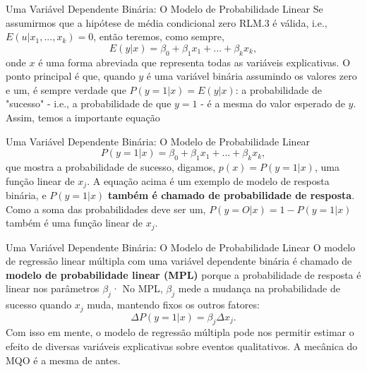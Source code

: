 \documentclass[t,14pt,mathserif]{beamer}
\begin{document}
{
\begin{frame}{Uma Variável Dependente Binária: O Modelo de Probabilidade Linear}
		\justifying 
         Se assumirmos que a hipótese de média condicional zero RLM.3 é válida, i.e., $E(u|x_1, ... ,x_k) = 0$, então teremos, como sempre,
        \begin{equation}
        E(y|x) = \beta_{0} + \beta_{1}x_1 + ... + \beta_{k}x_k, \nonumber
        \end{equation}
        onde $x$ é uma forma abreviada que representa todas as variáveis explicativas.
        \vfill
        O ponto principal é que, quando $y$ é uma variável binária assumindo os valores zero e um, é sempre verdade que $P(y = 1|x) = E(y|x)$: a probabilidade de "sucesso" - i.e., a probabilidade de que $y = 1$ - é a mesma do valor esperado de $y$. Assim, temos a importante equação
        
        \end{frame}
}  
   
{
\begin{frame}{Uma Variável Dependente Binária: O Modelo de Probabilidade Linear}
		\justifying 
        \begin{equation}
        P(y = 1|x) = \beta_{0} + \beta_{1}x_1 + ... + \beta_{k}x_k, \nonumber
        \end{equation}
       que mostra a probabilidade de sucesso, digamos, $p(x) = P(y = 1 |x)$, uma função linear de $x_j$. 
        \vfill 
        A equação acima é um exemplo de modelo de resposta binária, e $P(y = 1 |x)$  \textbf{também é chamado de probabilidade de resposta}. Como a soma das probabilidades deve ser um, $P(y = O|x) = 1 - P(y = 1 |x)$ também é uma função linear de $x_j$.
        \end{frame}
}  	

{
\begin{frame}{Uma Variável Dependente Binária: O Modelo de Probabilidade Linear}
		\justifying 
		\vfill
         O modelo de regressão linear múltipla com uma variável dependente binária é chamado de \textbf{modelo de probabilidade linear (MPL)} porque a probabilidade de resposta é linear nos parâmetros $\beta_j$· No MPL, $\beta_j$ mede a mudança na probabilidade de sucesso quando $x_j$ muda, mantendo fixos os outros fatores: 
        \begin{equation}
        \Delta P(y = 1|x) = \beta_j \Delta x_j . \nonumber
        \end{equation}
         Com isso em mente, o modelo de regressão múltipla pode nos permitir estimar o efeito de diversas variáveis explicativas sobre eventos qualitativos. A mecânica do MQO é a mesma de antes. 
        \end{frame}
}  	
\end{document}
